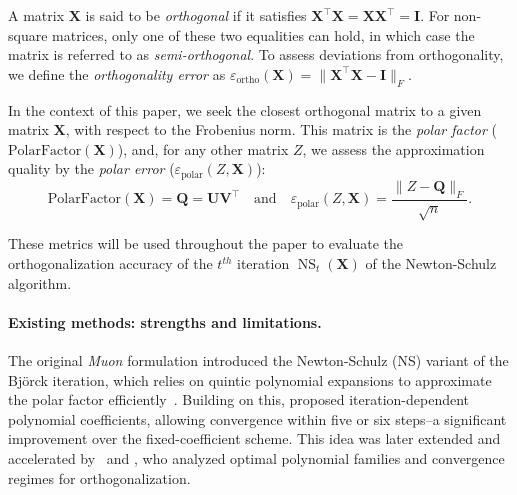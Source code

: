     A matrix $\mathbf{X}$ is said to be \textit{orthogonal} if it satisfies
        $\mathbf{X}^\top \mathbf{X} = \mathbf{X} \mathbf{X}^\top = \mathbf{I}$.
    For non-square matrices, only one of these two equalities can hold, in which case the matrix is referred to as 
    \textit{semi-orthogonal}.  
    To 
    assess
    deviations from orthogonality, we define the \textit{orthogonality error} as
        $\varepsilon_{\text{ortho}}(\mathbf{X}) = \|\mathbf{X}^\top \mathbf{X} - \mathbf{I}\|_F$.
    
    In the context of this paper, we seek the closest orthogonal matrix to a given matrix $\mathbf{X}$, 
    with respect to the Frobenius norm. 
    This matrix is the \textit{polar factor} ($\text{PolarFactor} (\mathbf{X})$), and, for any other matrix $Z$, we assess the approximation quality by the \textit{polar error} ($\varepsilon_{\text{polar}}(Z, \mathbf{X})$):
    \[
        \text{PolarFactor} (\mathbf{X}) = \mathbf{Q} = \mathbf{U}\mathbf{V}^\top \quad \text{and} \quad  \varepsilon_{\text{polar}}(Z, \mathbf{X}) = 
        \frac{\|Z  - \mathbf{Q}\|_F}{\sqrt{n}}.
    \]

    These metrics will be used throughout the paper to evaluate the orthogonalization accuracy of the $t^{th}$ iteration $\operatorname{NS}_t(\mathbf{X})$ of the Newton-Schulz algorithm.

\paragraph{Existing methods: strengths and limitations.}
The original \textit{Muon} formulation introduced the Newton-Schulz (NS) variant of the Björck iteration, which relies on quintic polynomial expansions to approximate the polar factor efficiently~\cite{jordan2024muon}. Building on this, \cite{cesista2025muonoptcoeffs} proposed iteration-dependent polynomial coefficients, allowing convergence within five or six steps--a significant improvement over the fixed-coefficient scheme. This idea was later extended and accelerated by~\cite{grishina_accelerating_2025} and \cite{amsel2025polar}, who analyzed optimal polynomial families and convergence regimes for orthogonalization.

